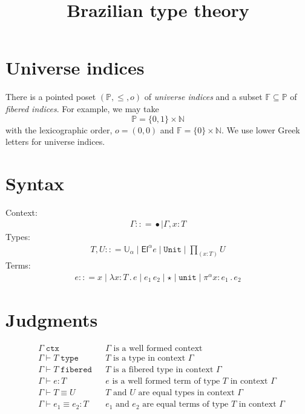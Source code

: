 \documentclass{article}
\newcommand{\NN}{\mathbb{N}} %
\newcommand{\PP}{\mathbb{P}} %
\newcommand{\FF}{\mathbb{F}} %
\newcommand{\zero}{o} %
\newcommand{\G}{\Gamma} %
\newcommand{\T}{T} %
\newcommand{\U}{U} %
\newcommand{\x}{x} %
\newcommand{\e}{e} %
\newcommand{\bnf}{\mathrel{{:}{:}{=}}}
\newcommand{\bnfor}{\mid}
\newcommand{\ctxempty}{\bullet} %
\newcommand{\ctxextend}[3]{#1, #2 {:} #3} %
\newcommand{\Universe}[1]{\mathbb{U}_{#1}} %
\newcommand{\El}[2]{\mathsf{El}^{#1} #2} %
\newcommand{\Unit}{\mathtt{Unit}} %
\newcommand{\Prod}[2]{{\textstyle\prod_{(#1 {:} #2)}}} %
\newcommand{\lam}[2]{\lambda #1 {:} #2 \,.\,} %
\newcommand{\app}[2]{#1\,#2} %
\newcommand{\unitTerm}{\star} %
\newcommand{\nUnit}{\mathtt{unit}} %
\newcommand{\nProd}[3]{\pi^{#1} #2 {:} #3 \,.\,} %
\newcommand{\isctx}[1]{#1\;\mathtt{ctx}} %
\newcommand{\istype}[2]{#1 \vdash #2\;\mathtt{type}} %
\newcommand{\isfib}[2]{#1 \vdash #2\;\mathtt{fibered}} %
\newcommand{\isterm}[3]{#1 \vdash #2 : #3} %
\newcommand{\eqtype}[3]{#1 \vdash #2 \equiv #3} %
\newcommand{\eqterm}[4]{#1 \vdash #2 \equiv #3 : #4} %
\begin{document}
\title{Brazilian type theory}
\maketitle

\section{Universe indices}
\label{sec:universe-indices}

There is a pointed poset $(\PP, {\leq}, \zero)$ of \emph{universe
  indices} and a subset $\FF \subseteq \PP$ of \emph{fibered indices}.
For example, we may take
%
\begin{equation*}
  \PP = \{0,1\} \times \NN
\end{equation*}
%
with the lexicographic order, $\zero = (0,0)$ and $\FF = \{0\} \times
\NN$. We use lower Greek letters for universe indices.

\section{Syntax}
\label{sec:syntax}

Context:
%
\begin{align*}
  \G \bnf
  \ctxempty \bnfor
  \ctxextend{\G}{\x}{\T}
\end{align*}
%
Types:
%
\begin{align*}
  \T, \U \bnf
  \Universe{\alpha} \bnfor
  \El{\alpha}{\e} \bnfor
  \Unit \bnfor
  \Prod{x}{\T} \U
\end{align*}
%
Terms:
%
\begin{align*}
  \e \bnf
  \x \bnfor
  \lam{\x}{\T} \e \bnfor
  \app{\e_1}{\e_2} \bnfor
  \unitTerm \bnfor
  \nUnit \bnfor
  \nProd{\alpha}{\x}{\e_1} \e_2
\end{align*}

\section{Judgments}
\label{sec:judgments}

\begin{align*}
& \isctx{\G} & & \text{$\G$ is a well formed context} \\
& \istype{\G}{\T} & & \text{$\T$ is a type in context $\G$} \\
& \isfib{\G}{\T} & & \text{$\T$ is a fibered type in context $\G$} \\
& \isterm{\G}{\e}{\T} & & \text{$\e$ is a well formed term of type $\T$ in context $\G$} \\
& \eqtype{\G}{\T}{\U} & & \text{$\T$ and $\U$ are equal types in context $\G$} \\
& \eqterm{\G}{\e_1}{\e_2}{\T} & & \text{$e_1$ and $e_2$ are equal terms of type $\T$ in context $\G$}
\end{align*}
\end{document}
